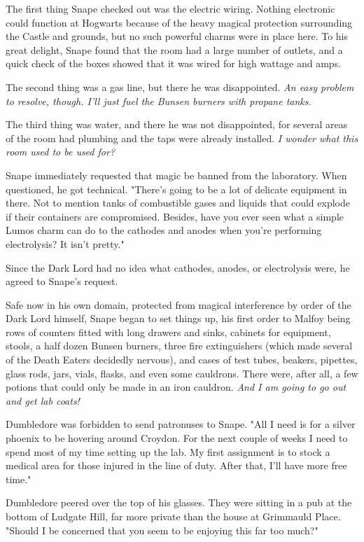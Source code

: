 The first thing Snape checked out was the electric wiring. Nothing electronic could function at Hogwarts because of the heavy magical protection surrounding the Castle and grounds, but no such powerful charms were in place here. To his great delight, Snape found that the room had a large number of outlets, and a quick check of the boxes showed that it was wired for high wattage and amps.

The second thing was a gas line, but there he was disappointed. \emph{An easy problem to resolve, though. I'll just fuel the Bunsen burners with propane tanks.}

The third thing was water, and there he was not disappointed, for several areas of the room had plumbing and the taps were already installed. \emph{I wonder what this room used to be used for?}

Snape immediately requested that magic be banned from the laboratory. When questioned, he got technical. "There's going to be a lot of delicate equipment in there. Not to mention tanks of combustible gases and liquids that could explode if their containers are compromised. Besides, have you ever seen what a simple Lumos charm can do to the cathodes and anodes when you're performing electrolysis? It isn't pretty."

Since the Dark Lord had no idea what cathodes, anodes, or electrolysis were, he agreed to Snape's request.

Safe now in his own domain, protected from magical interference by order of the Dark Lord himself, Snape began to set things up, his first order to Malfoy being rows of counters fitted with long drawers and sinks, cabinets for equipment, stools, a half dozen Bunsen burners, three fire extinguishers (which made several of the Death Eaters decidedly nervous), and cases of test tubes, beakers, pipettes, glass rods, jars, vials, flasks, and even some cauldrons. There were, after all, a few potions that could only be made in an iron cauldron. \emph{And I am going to go out and get lab coats!}

\sbreak

Dumbledore was forbidden to send patronuses to Snape. "All I need is for a silver phoenix to be hovering around Croydon. For the next couple of weeks I need to spend most of my time setting up the lab. My first assignment is to stock a medical area for those injured in the line of duty. After that, I'll have more free time."

Dumbledore peered over the top of his glasses. They were sitting in a pub at the bottom of Ludgate Hill, far more private than the house at Grimmauld Place. "Should I be concerned that you seem to be enjoying this far too much?"

